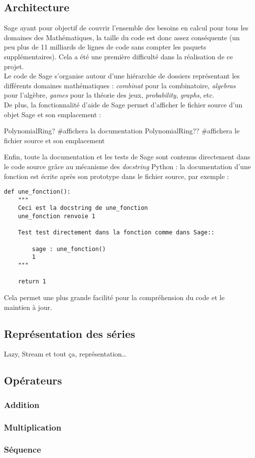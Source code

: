 \documentclass[12pt]{article}
\begin{document}
\subsection{Architecture}
Sage ayant pour objectif de couvrir l'ensemble des besoins en calcul pour
tous les domaines des Mathématiques, la taille du code est donc assez
conséquente (un peu plus de 11 milliards de lignes de code sans compter les
paquets supplémentaires). Cela a été une première difficulté dans la
réalisation de ce projet. \\
Le code de Sage s'organise autour d'une hiérarchie de dossiers représentant
les différents domaines mathématiques : \emph{combinat} pour la combinatoire,
\emph{algebras} pour l'algèbre, \emph{games} pour la théorie des jeux,
\emph{probability}, \emph{graphs}, etc.\\
De plus, la fonctionnalité d'aide de Sage permet d'afficher le fichier source
d'un objet Sage et son emplacement :
\begin{sageblock}
PolynomialRing? #affichera la documentation
PolynomialRing?? #affichera le fichier source et son emplacement
\end{sageblock}
Enfin, toute la documentation et les tests de Sage sont contenus directement dans le code
source grâce au mécanisme des \emph{docstring} Python : la documentation d'une
fonction est écrite après son prototype dans le fichier source, par exemple : 
\begin{verbatim}
def une_fonction():
    """
    Ceci est la docstring de une_fonction
    une_fonction renvoie 1
    
    Test test directement dans la fonction comme dans Sage::

        sage : une_fonction()
        1
    """

    return 1
\end{verbatim}
Cela permet une plus grande facilité pour la compréhension du code et le maintien à jour.




\subsection{Représentation des séries}
Lazy, Stream et tout ça, représentation…
\subsection{Opérateurs}
\subsubsection{Addition}
\subsubsection{Multiplication}
\subsubsection{Séquence}
\end{document}
